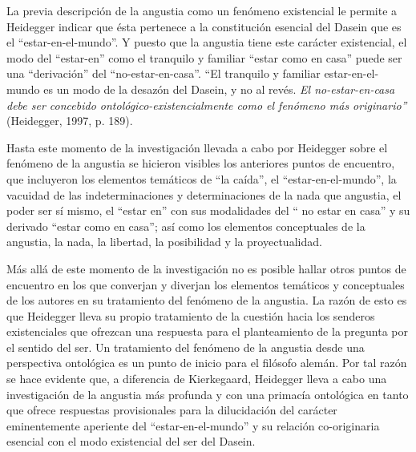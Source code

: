 \documentclass[]{article}
\begin{document}
La previa descripción de la angustia como un fenómeno existencial le permite a Heidegger indicar que ésta pertenece a la constitución esencial del Dasein que es el ``estar-en-el-mundo''. Y puesto que la angustia tiene este carácter existencial, el modo del ``estar-en'' como el tranquilo y familiar ``estar como en casa'' puede ser una ``derivación'' del ``no-estar-en-casa''. ``El tranquilo y familiar estar-en-el-mundo es un modo de la desazón del Dasein, y no al revés. \emph{El no-estar-en-casa debe ser concebido ontológico-existencialmente como el fenómeno más originario''} (Heidegger, 1997, p. 189).

Hasta este momento de la investigación llevada a cabo por Heidegger sobre el fenómeno de la angustia se hicieron visibles los anteriores puntos de encuentro, que incluyeron los elementos temáticos de ``la caída'', el ``estar-en-el-mundo'', la vacuidad de las indeterminaciones y determinaciones de la nada que angustia, el poder ser sí mismo, el ``estar en'' con sus modalidades del `` no estar en casa'' y su derivado ``estar como en casa''; así como los elementos conceptuales de la angustia, la nada, la libertad, la posibilidad y la proyectualidad.

Más allá de este momento de la investigación no es posible hallar otros puntos de encuentro en los que converjan y diverjan los elementos temáticos y conceptuales de los autores en su tratamiento del fenómeno de la angustia. La razón de esto es que Heidegger lleva su propio tratamiento de la cuestión hacia los senderos existenciales que ofrezcan una respuesta para el planteamiento de la pregunta por el sentido del ser. Un tratamiento del fenómeno de la angustia desde una perspectiva ontológica es un punto de inicio para el filósofo alemán. Por tal razón se hace evidente que, a diferencia de Kierkegaard, Heidegger lleva a cabo una investigación de la angustia más profunda y con una primacía ontológica en tanto que ofrece respuestas provisionales para la dilucidación del carácter eminentemente aperiente del ``estar-en-el-mundo'' y su relación co-originaria esencial con el modo existencial del ser del Dasein.
\end{document}
